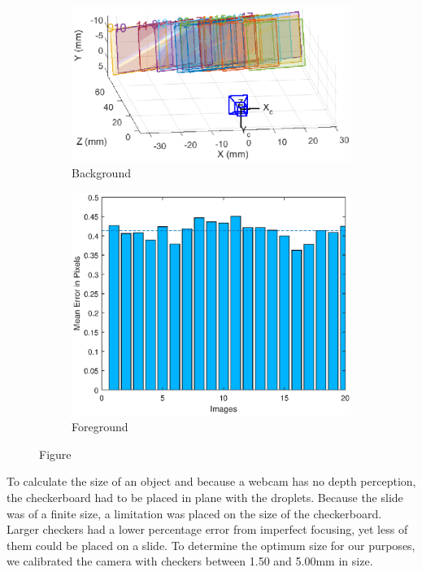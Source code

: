 \documentclass{physics_article_B}
\begin{document}
        \begin{figure}[H]
            \centering
            \begin{subfigure}[b]{0.4\textwidth}
                \includegraphics[width=\textwidth]{Figures/CameraExtrinsics.eps}
                \caption{Background}
                \label{fig:calib:pos}
            \end{subfigure}
            \begin{subfigure}[b]{0.4\textwidth}
                \includegraphics[width=\textwidth]{Figures/CameraError.eps}
                \caption{Foreground}
                \label{fig:calib:error}
            \end{subfigure}
            \caption{Figure }\label{fig:calib}
        \end{figure}
        
        To calculate the size of an object and because a webcam has no depth perception, the checkerboard had to be placed in plane with the droplets. Because the slide was of a finite size, a limitation was placed on the size of the checkerboard. Larger checkers had a lower percentage error from imperfect focusing, yet less of them could be placed on a slide. To determine the optimum size for our purposes, we calibrated the camera with checkers between 1.50 and 5.00mm in size. \\
        
\end{document}
